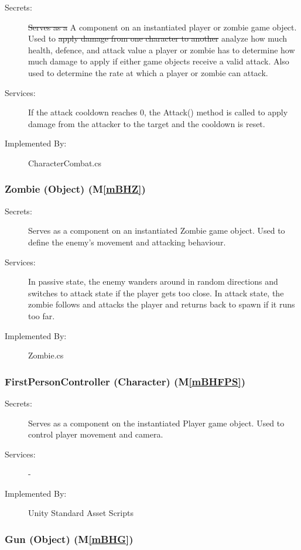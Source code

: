 \documentclass[12pt, titlepage]{article}
\newcommand{\mref}[1]{M\ref{#1}}
\begin{document}
\begin{description}
	\item[Secrets:] \sout{Serves as a} {\color {magenta} A} component on an instantiated player or zombie game object. Used to \sout{apply damage from one character to another} {\color {magenta} analyze how much health, defence, and attack value a player or zombie has to determine how much damage to apply if either game objects receive a valid attack. Also used to determine the rate at which a player or zombie can attack}.
	\item[Services:] If the attack cooldown reaches 0, the Attack() method is called to apply damage from the attacker to the target and the cooldown is reset. 
	\item[Implemented By:] CharacterCombat.cs
\end{description}

\subsubsection{Zombie (Object) (\mref{mBHZ})}

\begin{description}
	\item[Secrets:] Serves as a component on an instantiated Zombie game object. Used to define the enemy's movement and attacking behaviour.
	\item[Services:] In passive state, the enemy wanders around in random directions and switches to attack state if the player gets too close. In attack state, the zombie follows and attacks the player and returns back to spawn if it runs too far.
	\item[Implemented By:] Zombie.cs
\end{description}

\subsubsection{FirstPersonController (Character) (\mref{mBHFPS})}

\begin{description}
	\item[Secrets:] Serves as a component on the instantiated Player game object. Used to control player movement and camera.
	\item[Services:] -
	\item[Implemented By:] Unity Standard Asset Scripts
\end{description}

\subsubsection{Gun (Object) (\mref{mBHG})}
\end{document}
